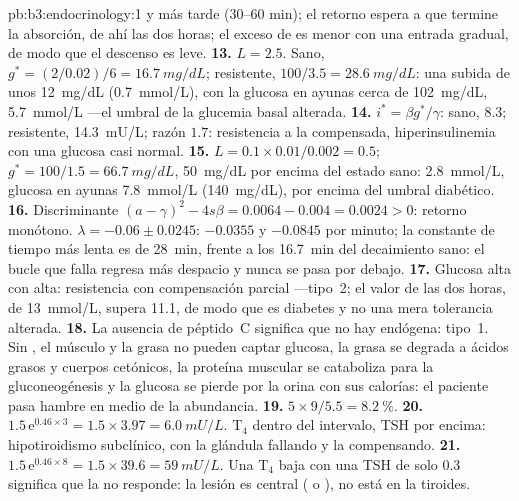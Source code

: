 \begin{solution}{pb:b3:endocrinology:1}
y más tarde (30--60 min); el retorno espera a que termine la absorción,
de ahí las dos horas; el exceso de  es menor con una entrada
gradual, de modo que el descenso es leve.
\textbf{13.} $L = 2.5$. Sano, $g^{*} = (2/0.02)/6 = \qty{16.7}{mg/dL}$;
resistente, $100/3.5 = \qty{28.6}{mg/dL}$: una subida de unos
\qty{12}{mg/dL} (\qty{0.7}{mmol/L}), con la glucosa en ayunas cerca de
\qty{102}{mg/dL}, \qty{5.7}{mmol/L} ---el umbral de la glucemia basal
alterada.
\textbf{14.} $i^{*} = \beta g^{*}/\gamma$: sano, $8.3$; resistente,
\qty{14.3}{mU/L}; razón $1.7$: resistencia a la  compensada,
hiperinsulinemia con una glucosa casi normal.
\textbf{15.} $L = 0.1\times 0.01/0.002 = 0.5$; $g^{*} = 100/1.5 =
\qty{66.7}{mg/dL}$, \qty{50}{mg/dL} por encima del estado sano:
\qty{2.8}{mmol/L}, glucosa en ayunas \qty{7.8}{mmol/L}
(\qty{140}{mg/dL}), por encima del umbral diabético.
\textbf{16.} Discriminante $(a - \gamma)^{2} - 4s\beta = 0.0064 - 0.004 =
0.0024 > 0$: retorno monótono. $\lambda = -0.06 \pm 0.0245$: $-0.0355$
y $-0.0845$ por minuto; la constante de tiempo más lenta es de
\qty{28}{min}, frente a los \qty{16.7}{min} del decaimiento sano: el
bucle que falla regresa más despacio y nunca se pasa por debajo.
\textbf{17.} Glucosa alta con  alta: resistencia con
compensación parcial ---tipo~2; el valor de las dos horas, de
\qty{13}{mmol/L}, supera \qty{11.1}{}, de modo que es diabetes y no una
mera tolerancia alterada.
\textbf{18.} La ausencia de péptido~C significa que no hay 
endógena: tipo~1. Sin , el músculo y la grasa no pueden captar
glucosa, la grasa se degrada a ácidos grasos y cuerpos cetónicos, la
proteína muscular se cataboliza para la gluconeogénesis y la glucosa se
pierde por la orina con sus calorías: el paciente pasa hambre en medio
de la abundancia.
\textbf{19.} $5\times 9/5.5 = \qty{8.2}{\%}$.
\textbf{20.} $1.5\,\mathrm{e}^{0.46\times 3} = 1.5\times 3.97 =
\qty{6.0}{mU/L}$. T$_{4}$ dentro del intervalo, TSH por encima:
hipotiroidismo subclínico, con la glándula fallando y la 
compensando.
\textbf{21.} $1.5\,\mathrm{e}^{0.46\times 8} = 1.5\times 39.6 =
\qty{59}{mU/L}$. Una T$_{4}$ baja con una TSH de solo $0.3$ significa
que la  no responde: la lesión es central ( o
), no está en la tiroides.

\end{solution}

